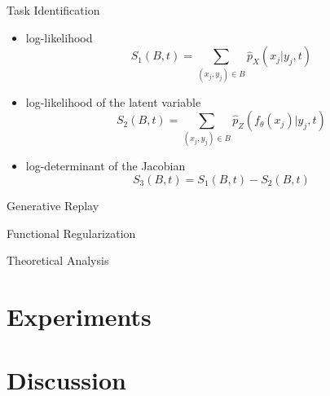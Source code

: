 \documentclass{beamer}
\begin{document}
\begin{frame}{Task Identification}
  \begin{itemize}
    \item <1-> log-likelihood
    \[
      S_1(B, t) = \sum_{(x_j, y_j) \in B} \hat{p}_X(x_j | y_j, t)
    \]
    \item <1-> log-likelihood of the latent variable 
    \[
      S_2(B, t) = \sum_{(x_j, y_j) \in B} \hat{p}_Z(f_\theta(x_j) | y_j, t)
    \]
    \item <1-> log-determinant of the Jacobian
    \[
      S_3(B, t) = S_1(B, t) - S_2(B, t)
    \]
  \end{itemize}
\end{frame}

\begin{frame}{Generative Replay}

\end{frame}

\begin{frame}{Functional Regularization}
  
\end{frame}

\begin{frame}{Theoretical Analysis}
  
\end{frame}

\section{Experiments}

\section{Discussion}
\begin{frame}
  
\end{frame}

\end{document}
